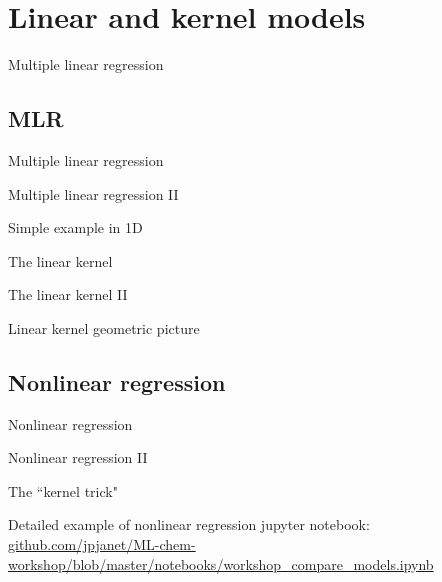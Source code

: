 \section{Linear and kernel models}
\begin{frame}[t]{Multiple linear regression}

\end{frame}
\subsection{MLR}
\begin{frame}[t]{Multiple linear regression}

\end{frame}
\begin{frame}[t]{Multiple linear regression II}

\end{frame}
\begin{frame}[t]{Simple example in 1D}

\end{frame}

%

\begin{frame}{The linear kernel}

\end{frame}
\begin{frame}{The linear kernel II}

\end{frame}
\begin{frame}{Linear kernel geometric picture}

\end{frame}
\subsection{Nonlinear regression}
\begin{frame}[t]{Nonlinear regression}

\end{frame}
\begin{frame}[t]{Nonlinear regression II}

\end{frame}
\begin{frame}[t]{The ``kernel trick"}

\end{frame}
\begin{frame}[t]{Detailed example of nonlinear regression}
jupyter notebook: \url{github.com/jpjanet/ML-chem-workshop/blob/master/notebooks/workshop_compare_models.ipynb}
\end{frame}

